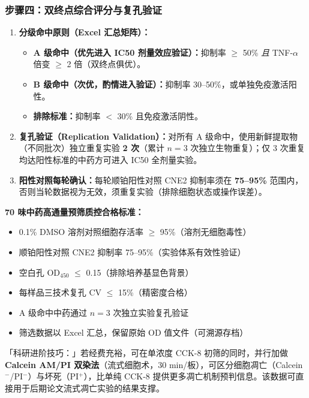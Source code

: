 \documentclass[12pt,a4paper,twoside]{article}
\begin{document}
\subsubsection{步骤四：双终点综合评分与复孔验证}

\begin{enumerate}
  \item \textbf{分级命中原则（Excel 汇总矩阵）：}
  \begin{itemize}
    \item \textbf{A 级命中（优先进入 IC50 剂量效应验证）：}抑制率 $\geq$ 50\% \textit{且} TNF-$\alpha$ 倍变 $\geq$ 2 倍（双终点俱优）。
    \item \textbf{B 级命中（次优，酌情进入验证）：}抑制率 30--50\%，或单独免疫激活阳性。
    \item \textbf{排除标准：}抑制率 $<$ 30\% 且免疫激活阴性。
  \end{itemize}
  \item \textbf{复孔验证（Replication Validation）：}对所有 A 级命中，使用新鲜提取物（不同批次）独立重复实验 \textbf{2 次}（累计 $n = 3$ 次独立生物重复）；仅 3 次重复均达阳性标准的中药方可进入 IC50 全剂量实验。
  \item \textbf{阳性对照每轮确认：}每轮顺铂阳性对照 CNE2 抑制率须在 \textbf{75--95\%} 范围内，否则当轮数据视为无效，须重复实验（排除细胞状态或操作误差）。
\end{enumerate}

\begin{qcbox}
\textbf{70 味中药高通量预筛质控合格标准：}
\begin{itemize}
  \item 0.1\% DMSO 溶剂对照细胞存活率 $\geq$ 95\%（溶剂无细胞毒性）
  \item 顺铂阳性对照 CNE2 抑制率 75--95\%（实验体系有效性验证）
  \item 空白孔 OD$_{450}$ $\leq$ 0.15（排除培养基显色背景）
  \item 每样品三技术复孔 CV $\leq$ 15\%（精密度合格）
  \item A 级命中中药通过 $n = 3$ 次独立实验复孔验证 
  \item 筛选数据以 Excel 汇总，保留原始 OD 值文件（可溯源存档）
\end{itemize}
\end{qcbox}

\begin{tipbox}
「科研进阶技巧：」若经费充裕，可在单浓度 CCK-8 初筛的同时，并行加做 \textbf{Calcein AM/PI 双染法}（流式细胞术，30 min/板），可区分细胞凋亡（Calcein$^{-}$/PI$^{-}$）与坏死（PI$^{+}$），比单纯 CCK-8 提供更多凋亡机制预判信息。该数据可直接用于后期论文流式凋亡实验的结果支撑。
\end{tipbox}
\end{document}
